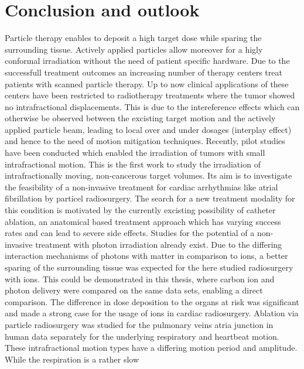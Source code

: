 \documentclass[type=dr, dr=rernat, accentcolor=tud7b,colorbacktitle, bigchapter, openright, twoside, 12pt ]{tudthesis}
\begin{document}

\chapter{Conclusion and outlook}

Particle therapy enables to deposit a high target dose while sparing the surrounding tissue. Actively applied particles allow moreover for a 
higly conformal irradiation without the need of patient specific hardware. Due to the successfull treatment outcomes an increasing number of 
therapy centers treat patients with scanned particle therapy. Up to now clinical applications of these centers have been restricted to radiotherapy 
treatments where the tumor showed no intrafractional displacements. This is due to the intereference effects which can otherwise be observed 
between the excisting target motion and the actively applied particle beam, leading to local over and under dosages (interplay effect) and hence to the need of 
motion mitigation techniques. Recently, pilot studies have been conducted which enabled the irradiation of tumors with small intrafractional 
motion. This is the first work to study the irradiation of intrafractionally moving, non-cancerous target volumes. Its aim is to investigate 
the feasibility of a non-invasive treatment for cardiac arrhythmias like atrial fibrillation by particel radiosurgery. The search for a new 
treatment modality for this condition is motivated by the currently excisting possibility of catheter ablation, an anatomical based treatment 
approach which has varying success rates and can lead to severe side effects. Studies for the potential of a non-invasive treatment with 
photon irradiation already exist. Due to the differing interaction mechanisms of photons with matter in comparison 
to ions, a better sparing of the surrounding tissue was expected for the here studied radiosurgery with ions. 
This could be demonstrated in this thesis, where carbon ion and photon delivery were compared on the same data sets, enabling a direct 
comparison. The difference in dose deposition to the organs at risk was significant and made a strong case for the usage of ions in cardiac 
radiosurgery.\newline  
\newline
Ablation via particle radiosurgery was studied for the pulmonary veins atria junction in human data separately for the underlying respiratory 
and heartbeat motion. These intrafractional motion types have a differing motion period and amplitude. While the respiration is a rather slow 
\end{document}
